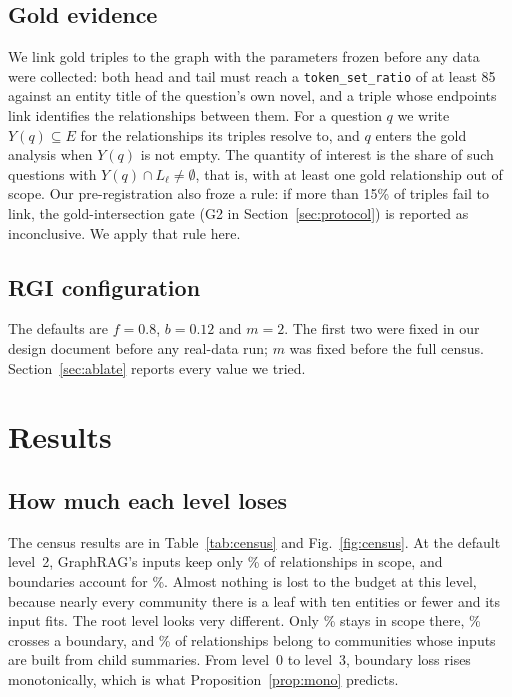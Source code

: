 \documentclass[journal]{IEEEtran}
\theoremstyle{remark}
\begin{document}
\subsection{Gold evidence}
We link gold triples to the graph with the parameters frozen before any data were collected: both head and tail must reach a \texttt{token\_set\_ratio} of at least 85 against an entity title of the question's own novel, and a triple whose endpoints link identifies the relationships between them. For a question $q$ we write $Y(q)\subseteq E$ for the relationships its triples resolve to, and $q$ enters the gold analysis when $Y(q)$ is not empty. The quantity of interest is the share of such questions with $Y(q)\cap L_\ell\neq\emptyset$, that is, with at least one gold relationship out of scope. Our pre-registration also froze a rule: if more than 15\% of triples fail to link, the gold-intersection gate (G2 in Section~\ref{sec:protocol}) is reported as inconclusive. We apply that rule here.

\subsection{RGI configuration}
The defaults are $f=0.8$, $b=0.12$ and $m=2$. The first two were fixed in our design document before any real-data run; $m$ was fixed before the full census. Section~\ref{sec:ablate} reports every value we tried.

\section{Results}\label{sec:results}

\subsection{How much each level loses}\label{sec:census}
The census results are in Table~\ref{tab:census} and Fig.~\ref{fig:census}. At the default level~2, GraphRAG's inputs keep only \CovCG\% of relationships in scope, and boundaries account for \BndCG\%. Almost nothing is lost to the budget at this level, because nearly every community there is a leaf with ten entities or fewer and its input fits. The root level looks very different. Only \CovAG\% stays in scope there, \BndAG\% crosses a boundary, and \IndAG\% of relationships belong to communities whose inputs are built from child summaries. From level~0 to level~3, boundary loss rises monotonically, which is what Proposition~\ref{prop:mono} predicts.
\end{document}

